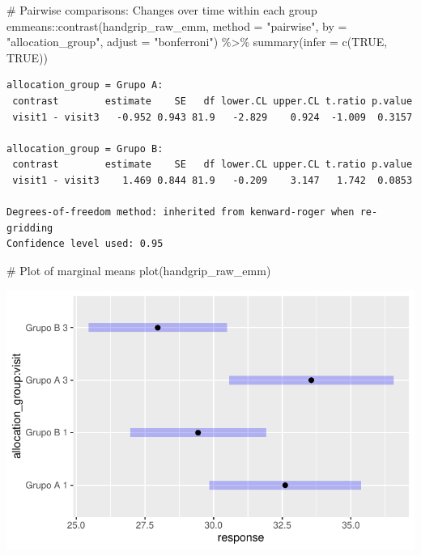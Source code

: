\documentclass[
  letterpaper,
  DIV=11,
  numbers=noendperiod]{scrartcl}
\newenvironment{Shaded}{\begin{snugshade}}{\end{snugshade}}
\newcommand{\AttributeTok}[1]{\textcolor[rgb]{0.40,0.45,0.13}{#1}}
\newcommand{\CommentTok}[1]{\textcolor[rgb]{0.37,0.37,0.37}{#1}}
\newcommand{\ConstantTok}[1]{\textcolor[rgb]{0.56,0.35,0.01}{#1}}
\newcommand{\FunctionTok}[1]{\textcolor[rgb]{0.28,0.35,0.67}{#1}}
\newcommand{\NormalTok}[1]{\textcolor[rgb]{0.00,0.23,0.31}{#1}}
\newcommand{\SpecialCharTok}[1]{\textcolor[rgb]{0.37,0.37,0.37}{#1}}
\newcommand{\StringTok}[1]{\textcolor[rgb]{0.13,0.47,0.30}{#1}}
\begin{document}
\begin{Shaded}
\begin{Highlighting}[]
\CommentTok{\# Pairwise comparisons: Changes over time within each group}
\NormalTok{emmeans}\SpecialCharTok{::}\FunctionTok{contrast}\NormalTok{(handgrip\_raw\_emm, }\AttributeTok{method =} \StringTok{"pairwise"}\NormalTok{, }\AttributeTok{by =} \StringTok{"allocation\_group"}\NormalTok{, }\AttributeTok{adjust =} \StringTok{"bonferroni"}\NormalTok{) }\SpecialCharTok{\%\textgreater{}\%} \FunctionTok{summary}\NormalTok{(}\AttributeTok{infer =} \FunctionTok{c}\NormalTok{(}\ConstantTok{TRUE}\NormalTok{, }\ConstantTok{TRUE}\NormalTok{))}
\end{Highlighting}
\end{Shaded}

\begin{verbatim}
allocation_group = Grupo A:
 contrast        estimate    SE   df lower.CL upper.CL t.ratio p.value
 visit1 - visit3   -0.952 0.943 81.9   -2.829    0.924  -1.009  0.3157

allocation_group = Grupo B:
 contrast        estimate    SE   df lower.CL upper.CL t.ratio p.value
 visit1 - visit3    1.469 0.844 81.9   -0.209    3.147   1.742  0.0853

Degrees-of-freedom method: inherited from kenward-roger when re-gridding 
Confidence level used: 0.95 
\end{verbatim}

\begin{Shaded}
\begin{Highlighting}[]
\CommentTok{\# Plot of marginal means}
\FunctionTok{plot}\NormalTok{(handgrip\_raw\_emm)}
\end{Highlighting}
\end{Shaded}

\includegraphics{Outcomes_V1V2V3_files/figure-pdf/handgrip_raw_emm-1.pdf}
\end{document}
